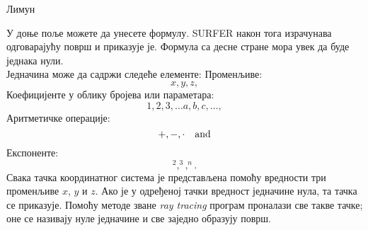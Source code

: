 ﻿\documentclass[en]{./../../common/SurferDesc}%
\begin{document}
\footnotesize
%
\begin{surferPage}
  \begin{surferTitle}Лимун
  \end{surferTitle}   %

У доње поље можете да унесете формулу. SURFER  након тога израчунава одговарајућу површ и приказује је. Формула са десне стране мора увек да буде једнака нули.
\\
Једначина може да садржи следеће елементе:
\newline
Променљиве:
\[x, y, z, \]
Коефицијенте у облику бројева или параметара:
\[1, 2, 3, \dots a, b, c, \dots, \]
Аритметичке операције:
\[+,  - , \cdot \quad \textnormal{and} \]
Експоненте:
\[ ^2, ^3, ^n .\]
Свака тачка координатног система је представљена помоћу вредности три променљиве $x$, $y$ и $z$. Ако је у одређеној тачки вредност једначине нула, та тачка се приказује. Помоћу методе зване \textit{ray tracing} програм проналази све такве тачке; оне се називају нуле једначине и све заједно образују површ.

  
  \begin{surferText}
     \end{surferText}
\end{surferPage}


\end{document}

